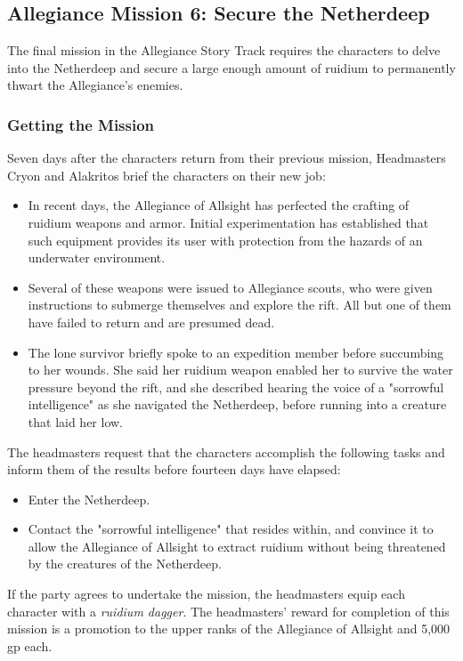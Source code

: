 \documentclass[10pt,a4paper,twoside,bg=print,twocolumn,openany,nodeprecatedcode]{dndbook}
\begin{document}
\subsection{Allegiance Mission 6: Secure the Netherdeep}
The final mission in the Allegiance Story Track requires the characters to delve into the Netherdeep and secure a large enough amount of ruidium to permanently thwart the Allegiance's enemies.

\subsubsection{Getting the Mission}
Seven days after the characters return from their previous mission, Headmasters Cryon and Alakritos brief the characters on their new job:


\begin{itemize}
\item In recent days, the Allegiance of Allsight has perfected the crafting of ruidium weapons and armor. Initial experimentation has established that such equipment provides its user with protection from the hazards of an underwater environment.
\item Several of these weapons were issued to Allegiance scouts, who were given instructions to submerge themselves and explore the rift. All but one of them have failed to return and are presumed dead.
\item The lone survivor briefly spoke to an expedition member before succumbing to her wounds. She said her ruidium weapon enabled her to survive the water pressure beyond the rift, and she described hearing the voice of a "sorrowful intelligence" as she navigated the Netherdeep, before running into a creature that laid her low.
\end{itemize}

The headmasters request that the characters accomplish the following tasks and inform them of the results before fourteen days have elapsed:


\begin{itemize}
\item Enter the Netherdeep.
\item Contact the "sorrowful intelligence" that resides within, and convince it to allow the Allegiance of Allsight to extract ruidium without being threatened by the creatures of the Netherdeep.
\end{itemize}

If the party agrees to undertake the mission, the headmasters equip each character with a \textit{ruidium dagger}. The headmasters' reward for completion of this mission is a promotion to the upper ranks of the Allegiance of Allsight and 5,000 gp each.
\end{document}
